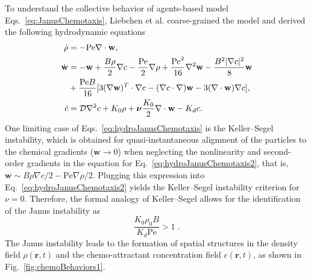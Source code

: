 \documentclass[a4paper, amsfonts, amssymb, amsmath, reprint, showkeys, showpacs, nofootinbib, twoside]{revtex4-2}
\begin{document}
To understand the collective behavior of agents-based model Eqs.~\eqref{eq:JanusChemotaxis}, Liebchen et al. coarse-grained the model and derived the following hydrodynamic equations
\begin{subequations}
    \label{eq:hydroJanusChemotaxis}
    \begin{align}
        \dot{\rho}&=-\mathrm{Pe}\nabla \cdot \mathbf{w},\\
        \dot{\mathbf{w}}&=-\mathbf{w}+\frac{B\rho}{2}\nabla c-\frac{\mathrm{Pe}}{2}\nabla \rho +\frac{\mathrm{Pe}^2}{16}\nabla ^2\mathbf{w}-\frac{B^2|\nabla c|^2}{8}\mathbf{w}\notag\\
        &+\frac{\mathrm{Pe}B}{16}[3(\nabla \mathbf{w})^T\cdot \nabla c-(\nabla c\cdot \nabla )\mathbf{w}-3(\nabla \cdot \mathbf{w})\nabla c],\\
        \dot{c}&=\mathcal{D} \nabla ^2c+K_0\rho +\boldsymbol{\nu }\frac{K_0}{2}\nabla \cdot \mathbf{w}-K_dc.\label{eq:hydroJanusChemotaxis2}
    \end{align}
\end{subequations}
One limiting case of Eqs.~\eqref{eq:hydroJanusChemotaxis} is the Keller--Segel instability, which is obtained for quasi-instantaneous alignment of the particles to the chemical gradients ($\mathbf{w}\rightarrow 0$) when neglecting the nonlinearity and second-order gradients in the equation for Eq.~\eqref{eq:hydroJanusChemotaxis2}, that is, $\mathbf{w}\sim B\rho\nabla c/2-\mathrm{Pe}\nabla\rho/2$. Plugging this expression into Eq.~\eqref{eq:hydroJanusChemotaxis2} yields the Keller--Segel instability criterion for $\nu=0$. Therefore, the formal analogy of Keller--Segel allows for the identification of the Janus instability as
\begin{equation}
    \label{eq:JanusInstability}
    \frac{K_0\rho_0 B}{K_d\mathrm{Pe}}>1\;.
\end{equation} 
The Janus instability leads to the formation of spatial structures in the density field $\rho(\mathbf{r},t)$ and the chemo-attractant concentration field $c(\mathbf{r},t)$, as shown in Fig.~\ref{fig:chemoBehaviors1}.
\end{document}
